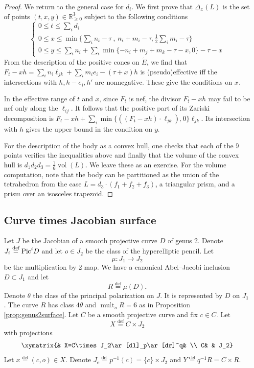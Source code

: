 \documentclass[12pt]{amsart}
\theoremstyle{definition}
\newcommand{\bb}{\ensuremath{\mathfrak{b}}}
\renewcommand{\geq}{\geqslant}
\renewcommand{\leq}{\leqslant}
\DeclareMathOperator{\mult}{mult}
\DeclareMathOperator{\vol}{vol}
\newcommand{\deq}{\ensuremath{\stackrel{\textrm{def}}{=}}}
\newcommand{\inob}[2]{\ensuremath{{\Delta}_{#1}(#2)}}
\newcommand{\?}{ \circled{{\large\bf ?}}}
\let\bb\mathbb
\begin{document}
\begin{proof}
We return to the general case for $d_i$. We first prove that $\inob{x}{L}$ is the set of points $(t,x,y)\in\bb R^3_{\geq 0}$ subject to the following conditions
\[\begin{cases}0\leq t\leq\sum_id_i\\
	0\leq x\leq\min\{\sum_in_i-\tau\ ,\ n_i+m_i-\tau, \frac 12\sum_im_i-\tau\}\\
	0\leq y\leq\sum_in_i+\sum_i\min\{-n_i+m_j+m_k-\tau-x,0\}-\tau-x
\end{cases}
\]From the description of the positive cones on $\widetilde E$, we find that $F_t-xh=\sum_in_i\ell_{jk}+\sum_im_ie_i-(\tau+x)h$ is (pseudo)effective iff the intersections with $h,h-e_i,h'$ are nonnegative. These give the conditions on $x$. 

In the effective range of $t$ and $x$, since $F_t$ is nef, the divisor $F_t-xh$ may fail to be nef only along the $\ell_{ij}$. It follows that the positive part of its Zariski decomposition is $F_t-xh+\sum_i\min\{((F_t-xh)\cdot\ell_{jk}),0\}\ell_{jk}$. Its intersection with $h$ gives the upper bound in the condition on $y$.

For the description of the body as a convex hull, one checks that each of the 9 points verifies the inequalities above and finally that the volume of the convex hull is $d_1d_2d_3=\frac 16\vol(L)$. We leave these as an exercise. For the volume computation, note that the body can be partitioned as the union of the tetrahedron from the case $L=d_3\cdot (f_1+f_2+f_3)$, a triangular prism, and a prism over an isosceles trapezoid. 
\end{proof}


\subsection{Curve times Jacobian surface}

 Let $J$ be the Jacobian of a smooth projective curve $D$ of genus 2. Denote $J_i\deq{\rm Pic}^iD$ and let $o\in J_2$ be the class of the hyperelliptic pencil. Let \[\mu:J_1\to J_2\] be the multiplication by 2 map. We have a canonical Abel--Jacobi inclusion $D\subset J_1$ and let 
 \[R\deq\mu(D).\] Denote $\theta$ the class of the principal polarization on $J$. It is represented by $D$ on $J_1$. The curve $R$ has class $4\theta$ and $\mult_oR=6$ as in Proposition \ref{prop:genus2surface}.
Let $C$ be a smooth projective curve and fix $c\in C$. Let 
\[X\deq C\times J_2\] with projections
\[\xymatrix{& X=C\times J_2\ar[dl]_p\ar[dr]^q& \\ C& & J_2}\] 
Let $x\deq (c,o)\in X$. Denote $J_c\deq p^{-1}(c)=\{c\}\times J_2$ and $Y\deq q^{-1}R=C\times R$. 
\end{document}
